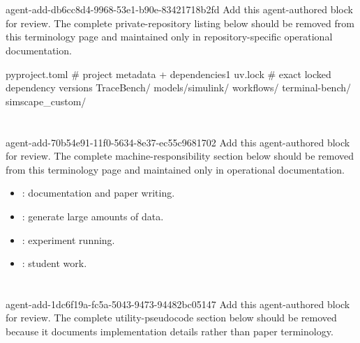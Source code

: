 \documentclass[11pt]{article}
\begin{document}
\section*{}
\agentProposedEdit
  {agent-add-db6cc8d4-9968-53e1-b90e-83421718b2fd}
  {Add this agent-authored block for review.}
  {}
  {The complete private-repository listing below should be removed from this terminology page and maintained only in repository-specific operational documentation.}
\begin{DocCode}
pyproject.toml      # project metadata + dependencies1
uv.lock             # exact locked dependency versions
TraceBench/
models/simulink/
workflows/
terminal-bench/
simscape_custom/
\end{DocCode}

\section*{}
\agentProposedEdit
  {agent-add-70b54e91-11f0-5634-8e37-ec55c9681702}
  {Add this agent-authored block for review.}
  {}
  {The complete machine-responsibility section below should be removed from this terminology page and maintained only in operational documentation.}
\begin{itemize}
    \item {}: documentation and paper writing.
    \item {}: generate large amounts of data.
    \item {}: experiment running.
    \item {}: student work.
\end{itemize}



\section*{}
\agentProposedEdit
  {agent-add-1dc6f19a-fc5a-5043-9473-94482bc05147}
  {Add this agent-authored block for review.}
  {}
  {The complete utility-pseudocode section below should be removed because it documents implementation details rather than paper terminology.}
\end{document}
